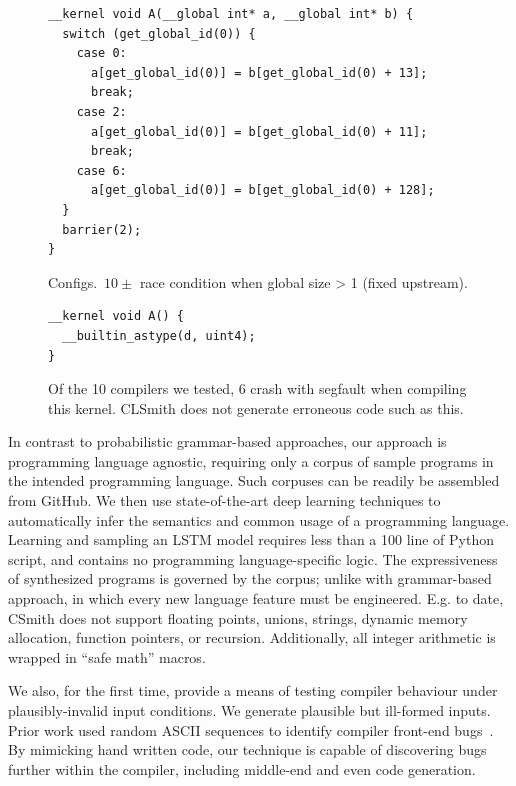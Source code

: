 \begin{figure}
\lstset{language=[OpenCL]C}
\begin{lstlisting}
__kernel void A(__global int* a, __global int* b) {
  switch (get_global_id(0)) {
    case 0:
      a[get_global_id(0)] = b[get_global_id(0) + 13];
      break;
    case 2:
      a[get_global_id(0)] = b[get_global_id(0) + 11];
      break;
    case 6:
      a[get_global_id(0)] = b[get_global_id(0) + 128];
  }
  barrier(2);
}
\end{lstlisting}
\caption{%
	Configs.\ $10\pm$ race condition when global size > 1 (fixed upstream).
}
\label{lst:oclgrind-llvm-densemap-assertion}
\end{figure}

\begin{figure}
\lstset{language=[OpenCL]C}
\begin{lstlisting}
__kernel void A() {
  __builtin_astype(d, uint4);
}
\end{lstlisting}
\caption{%
	Of the 10 compilers we tested, 6 crash with segfault when compiling this kernel.
	CLSmith does not generate erroneous code such as this.
}%
\label{fig:motivating-segfault}
\end{figure}


In contrast to probabilistic grammar-based approaches, our approach is programming language agnostic, requiring only a corpus of sample programs in the intended programming language. Such corpuses can be readily be assembled from GitHub. We then use state-of-the-art deep learning techniques to automatically infer the semantics and common usage of a programming language. Learning and sampling an LSTM model requires less than a 100 line of Python script, and contains no programming language-specific logic. The expressiveness of synthesized programs is governed by the corpus; unlike with grammar-based approach, in which every new language feature must be engineered. E.g. to date, CSmith does not support floating points, unions, strings, dynamic memory allocation, function pointers, or recursion. Additionally, all integer arithmetic is wrapped in ``safe math'' macros.

We also, for the first time, provide a means of testing compiler behaviour under plausibly-invalid input conditions. We generate plausible but ill-formed inputs. Prior work used random ASCII sequences to identify compiler front-end bugs~\cite{McKeeman1998}. By mimicking hand written code, our technique is capable of discovering bugs further within the compiler, including middle-end and even code generation.

